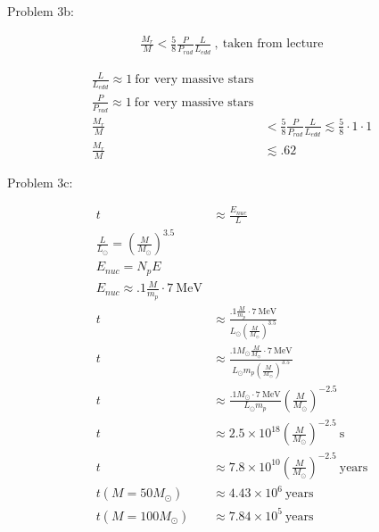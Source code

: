 \documentclass[10pt,letter,preprint]{aastex}
\begin{document}
Problem 3b:

\begin{align}
\frac{M_r}{M} < \frac{5}{8} \frac{P}{P_{rad}} \frac{L}{L_{edd}}~,~\text{taken from lecture}
\end{align}

\begin{align}
\frac{L}{L_{edd}} \approx 1~\text{for very massive stars}\\
\frac{P}{P_{rad}} \approx 1 ~\text{for very massive stars}\\
\frac{M_r}{M} &< \frac{5}{8} \frac{P}{P_{rad}} \frac{L}{L_{edd}} \lesssim \frac{5}{8}\cdot 1\cdot 1\\
\frac{M_r}{M} &\lesssim .62
\end{align}

Problem 3c:

\begin{align}
t& \approx \frac{E_{nuc}}{L}\\
\frac{L}{L_\odot} = \left( \frac{M}{M_\odot} \right)^{3.5}\\
E_{nuc} = N_pE\\
E_{nuc} \approx .1 \frac{M}{m_p} \cdot 7~\text{MeV}\\
t & \approx \frac{.1 \frac{M}{m_p} \cdot 7~\text{MeV}}{ L_\odot \left( \frac{M}{M_\odot} \right)^{3.5}}\\
t & \approx \frac{.1 M_\odot \frac{M}{M_\odot} \cdot 7~\text{MeV}}{ L_\odot m_p \left( \frac{M}{M_\odot} \right)^{3.5}}\\
t & \approx \frac{.1 M_\odot  \cdot 7~\text{MeV}}{ L_\odot m_p }\left( \frac{M}{M_\odot} \right)^{-2.5}\\
t & \approx 2.5 \times 10^{18}\left( \frac{M}{M_\odot} \right)^{-2.5}~\text{s}\\
t & \approx 7.8 \times 10^{10}\left( \frac{M}{M_\odot} \right)^{-2.5}~\text{years}\\
t(M = 50M_\odot) & \approx 4.43 \times 10^6~\text{years}\\
t(M = 100M_\odot) & \approx 7.84 \times 10^5~\text{years}%
\end{align}
\end{document}
